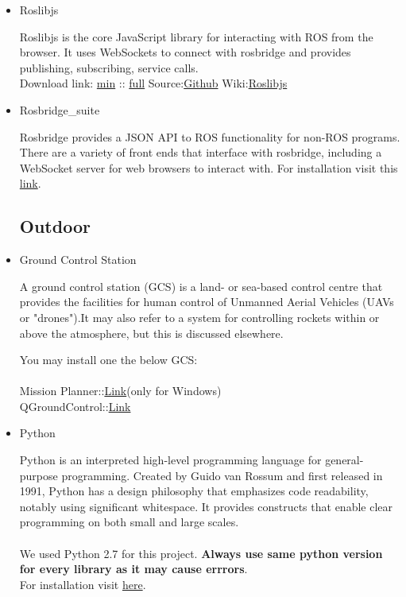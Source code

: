 \documentclass[a4paper,12pt,oneside]{book}
\begin{document}
\begin{itemize}
   
   \item Roslibjs
   
   Roslibjs is the core JavaScript library for interacting with ROS from the browser. It uses WebSockets to connect with rosbridge and provides publishing, subscribing, service calls.\\
   Download link:
   \href{https://static.robotwebtools.org/roslibjs/current/roslib.min.js}{min}
   ::
   \href{https://static.robotwebtools.org/roslibjs/current/roslib.js}{full}
   Source:\href{https://github.com/RobotWebTools/roslibjs}{Github}
   Wiki:\href{http://www.ros.org/wiki/roslibjs/}{Roslibjs}\\
   
  \item Rosbridge\_suite
  
  Rosbridge provides a JSON API to ROS functionality for non-ROS programs. There are a variety of front ends that interface with rosbridge, including a WebSocket server for web browsers to interact with.
  For installation visit this \href{http://wiki.ros.org/rosbridge_suite}{link}.
  \subsection{Outdoor}
  \item Ground Control Station
  
  A ground control station (GCS) is a land- or sea-based control centre that provides the facilities for human control of Unmanned Aerial Vehicles (UAVs or "drones").It may also refer to a system for controlling rockets within or above the atmosphere, but this is discussed elsewhere.
  
  You may install one the below GCS:\\ \\
  Mission Planner::\href{http://ardupilot.org/planner/docs/common-install-mission-planner.html}{Link}(only for Windows)\\
  QGroundControl::\href{https://docs.qgroundcontrol.com/en/getting_started/download_and_install.html}{Link}
  
  \item Python 
  
  Python is an interpreted high-level programming language for general-purpose programming. Created by Guido van Rossum and first released in 1991, Python has a design philosophy that emphasizes code readability, notably using significant whitespace. It provides constructs that enable clear programming on both small and large scales.\\ \\
  We used Python 2.7 for this project.
  \textbf{Always use same python version for every library as it may cause errrors}.\\
  For installation visit \href{https://www.python.org/getit/}{here}.
  

\end{itemize}
\end{document}
